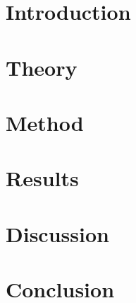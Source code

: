 \documentclass[a4paper,twoside,11pt]{report} %
\begin{document}

\pagecolor{white}
\pagestyle{empty}
\todototoc
\listoftodos
\cleardoublepage 

\clearpage 
\pagestyle{main}

\clearpage 

\clearpage 

\cleardoublepage 
\tableofcontents
\cleardoublepage 

\cleardoublepage
\chapter{Introduction}

\cleardoublepage
\chapter{Theory}

\cleardoublepage
\chapter{Method}
\label{sec:method}

\cleardoublepage
\chapter{Results}
\label{sec:results}

\cleardoublepage
\chapter{Discussion}
\label{sec:discussion}

\cleardoublepage
\chapter{Conclusion}
\label{sec:conclusion}


\printbibliography[heading=bibintoc,title={Bibliography}]
\cleardoublepage 
\appendix

\cleartoleftpage

\end{document}

